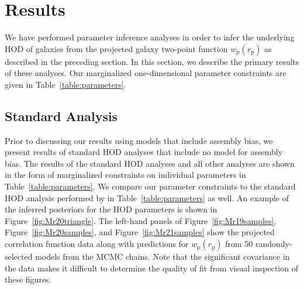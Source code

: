 \documentclass[usenatbib,usegraphicx,letterpaper]{mn2e}
\newcommand{\wprp}{w_{\mathrm{p}}}
\newcommand{\rp}{r_{\mathrm{p}}}
\begin{document}
\section{Results}
\label{section:results}

We have performed parameter inference analyses in order to infer the underlying HOD of 
galaxies from the projected galaxy two-point function $\wprp(\rp)$ as described in the preceding 
section. In this section, we describe the primary results of these analyses. Our marginalized 
one-dimensional parameter constraints are given in Table~\ref{table:parameters}.

\subsection{Standard Analysis}
\label{subsection:standard}

Prior to discussing our results using models that include assembly bias, we present 
results of standard HOD analyses that include no model for assembly bias. The results of 
the standard HOD analyses and all other analyses are shown in the form of marginalized 
constraints on individual parameters in Table~\ref{table:parameters}. We compare our parameter 
constraints to the standard HOD analysis performed by \citet{zehavi_etal11} in Table~\ref{table:parameters} 
as well. An example of the inferred posteriors for the HOD parameters is shown in Figure~\ref{fig:Mr20triangle}. 
The left-hand panels of Figure~\ref{fig:Mr19samples}, Figure~\ref{fig:Mr20samples}, and Figure~\ref{fig:Mr21samples} 
show the projected correlation function data along with predictions for $\wprp(\rp)$ from 50 randomly-selected 
models from the MCMC chains. Note that the significant covariance in the data makes it difficult to 
determine the quality of fit from visual inspection of these figures.
\end{document}
